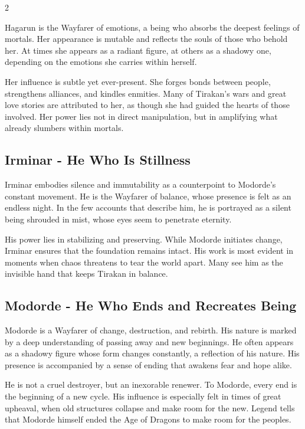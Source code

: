 \begin{multicols}{2}
{Hagarun is the Wayfarer of emotions, a being who absorbs the deepest feelings of mortals. Her appearance is mutable and reflects the souls of those who behold her. At times she appears as a radiant figure, at others as a shadowy one, depending on the emotions she carries within herself.

Her influence is subtle yet ever-present. She forges bonds between people, strengthens alliances, and kindles enmities. Many of Tirakan's wars and great love stories are attributed to her, as though she had guided the hearts of those involved. Her power lies not in direct manipulation, but in amplifying what already slumbers within mortals.

\subsection{Irminar - He Who Is Stillness}\label{subsec:irminar-der-ruhe-ist}

Irminar embodies silence and immutability as a counterpoint to Modorde's constant movement. He is the Wayfarer of balance, whose presence is felt as an endless night. In the few accounts that describe him, he is portrayed as a silent being shrouded in mist, whose eyes seem to penetrate eternity.

His power lies in stabilizing and preserving. While Modorde initiates change, Irminar ensures that the foundation remains intact. His work is most evident in moments when chaos threatens to tear the world apart. Many see him as the invisible hand that keeps Tirakan in balance.

\subsection{Modorde - He Who Ends and Recreates Being}\label{subsec:modorde-der-das-sein-beendet-und-neu-erschafft}

Modorde is a Wayfarer of change, destruction, and rebirth. His nature is marked by a deep understanding of passing away and new beginnings. He often appears as a shadowy figure whose form changes constantly, a reflection of his nature. His presence is accompanied by a sense of ending that awakens fear and hope alike.

He is not a cruel destroyer, but an inexorable renewer. To Modorde, every end is the beginning of a new cycle. His influence is especially felt in times of great upheaval, when old structures collapse and make room for the new. Legend tells that Modorde himself ended the Age of Dragons to make room for the peoples.

}
\end{multicols}
